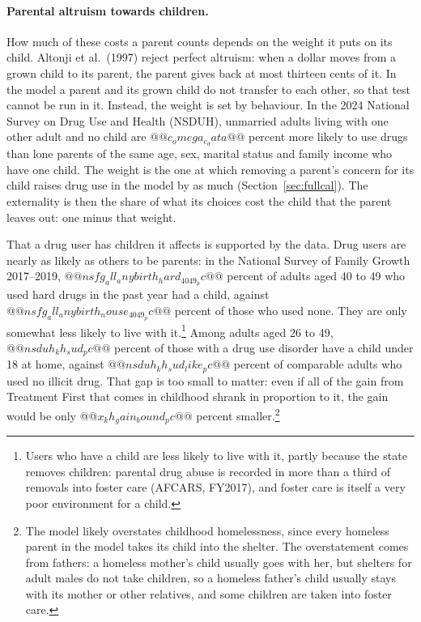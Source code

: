 \documentclass[10pt]{article}
\begin{document}
\paragraph{Parental altruism towards children.} How much of these costs a parent counts depends on the weight it puts on its child. Altonji et al.\ (1997) reject perfect altruism: when a dollar moves from a grown child to its parent, the parent gives back at most thirteen cents of it. In the model a parent and its grown child do not transfer to each other, so that test cannot be run in it. Instead, the weight is set by behaviour. In the 2024 National Survey on Drug Use and Health (NSDUH), unmarried adults living with one other adult and no child are $@@c_omega_c_data@@$ percent more likely to use drugs than lone parents of the same age, sex, marital status and family income who have one child. The weight is the one at which removing a parent's concern for its child raises drug use in the model by as much (Section~\ref{sec:fullcal}). The externality is then the share of what its choices cost the child that the parent leaves out: one minus that weight.

That a drug user has children it affects is supported by the data. Drug users are nearly as likely as others to be parents: in the National Survey of Family Growth 2017--2019, $@@nsfg_all_anybirth_hard_4049_pc@@$ percent of adults aged 40 to 49 who used hard drugs in the past year had a child, against $@@nsfg_all_anybirth_nouse_4049_pc@@$ percent of those who used none. They are only somewhat less likely to live with it.\footnote{Users who have a child are less likely to live with it, partly because the state removes children: parental drug abuse is recorded in more than a third of removals into foster care (AFCARS, FY2017), and foster care is itself a very poor environment for a child.} Among adults aged 26 to 49, $@@nsduh_kh_sud_pc@@$ percent of those with a drug use disorder have a child under 18 at home, against $@@nsduh_kh_sud_like_pc@@$ percent of comparable adults who used no illicit drug. That gap is too small to matter: even if all of the gain from Treatment First that comes in childhood shrank in proportion to it, the gain would be only $@@x_kh_gain_bound_pc@@$ percent smaller.\footnote{The model likely overstates childhood homelessness, since every homeless parent in the model takes its child into the shelter. The overstatement comes from fathers: a homeless mother's child usually goes with her, but shelters for adult males do not take children, so a homeless father's child usually stays with its mother or other relatives, and some children are taken into foster care.}
\end{document}
